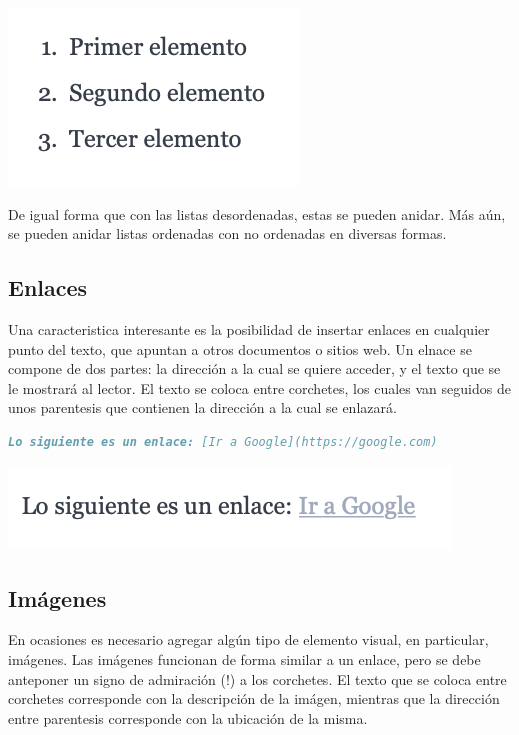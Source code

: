 \includegraphics[]{apendices/markdown/imagenes/md_olist.png}

De igual forma que con las listas desordenadas, estas se pueden anidar. Más
aún, se pueden anidar listas ordenadas con no ordenadas en diversas formas.

\subsection*{Enlaces}

Una caracteristica interesante es la posibilidad de insertar enlaces en cualquier
punto del texto, que apuntan a otros documentos o sitios web. Un elnace se compone
de dos partes: la dirección a la cual se quiere acceder, y el texto que se le
mostrará al lector. El texto se coloca entre corchetes, los cuales van seguidos
de unos parentesis que contienen la dirección a la cual se enlazará.

\begin{lstlisting}[language=Markdown]
Lo siguiente es un enlace: [Ir a Google](https://google.com)
\end{lstlisting}

\includegraphics[]{apendices/markdown/imagenes/md_enlace.png}

\subsection*{Imágenes}

En ocasiones es necesario agregar algún tipo de elemento visual, en particular,
imágenes. Las imágenes funcionan de forma similar a un enlace, pero se debe
anteponer un signo de admiración (!) a los corchetes. El texto que se coloca
entre corchetes corresponde con la descripción de la imágen, mientras que la
dirección entre parentesis corresponde con la ubicación de la misma.

